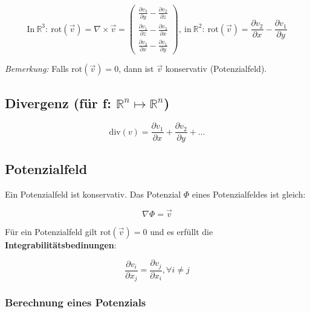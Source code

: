 \documentclass[11pt]{article}
\begin{document}
\begin{equation*}
	\text{In}\ \mathbb{R}^3:\ \text{rot}(\vec{v})=\nabla\times \vec{v} =
	\begin{pmatrix}
		\frac{\partial v_3}{\partial y} - \frac{\partial v_2}{\partial z}\\
		\frac{\partial v_1}{\partial z} - \frac{\partial v_3}{\partial x}\\
		\frac{\partial v_2}{\partial x} - \frac{\partial v_1}{\partial y}
	\end{pmatrix},\ \text{in}\ \mathbb{R}^2:\ \text{rot}(\vec{v}) = \frac{\partial v_2}{\partial x} - \frac{\partial v_1}{\partial y}
\end{equation*}

\emph{Bemerkung:} Falls $\text{rot}(\vec{v})=0$, dann ist $\vec{v}$ konservativ (Potenzialfeld).

\subsection{Divergenz (f{\"u}r f: $\mathbb{R}^n \mapsto \mathbb{R}^n$)}
\begin{equation*}
	\text{div}(v)= \frac{\partial v_1}{\partial x} + \frac{\partial v_2}{\partial y} + ... 
\end{equation*}

\subsection{Potenzialfeld}

Ein Potenzialfeld ist konservativ. Das Potenzial $\Phi$ eines Potenzialfeldes ist gleich:

\begin{equation*}
	\nabla \Phi = \vec{v}
\end{equation*}

F{\"u}r ein Potenzialfeld gilt $\text{rot}(\vec{v})=0$ und es erf{\"u}llt die \textbf{Integrabilit{\"a}tsbedinungen}:

\begin{equation*}
	\frac{\partial v_i}{\partial x_j}=\frac{\partial v_j}{\partial x_i},\forall i \neq j
\end{equation*}

\subsubsection*{Berechnung eines Potenzials}
\end{document}
